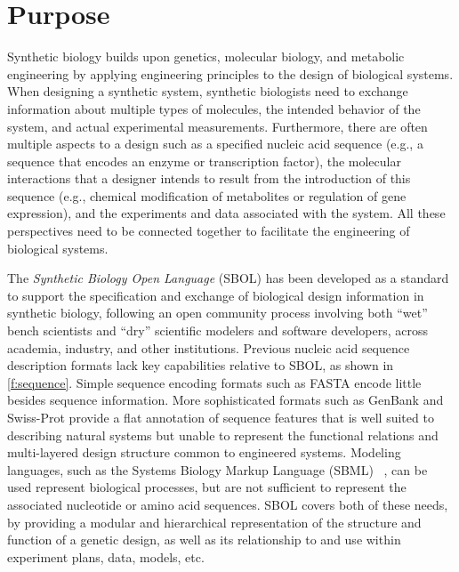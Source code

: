 \section{Purpose}

Synthetic biology builds upon genetics, molecular biology, and metabolic engineering by applying engineering principles to the design of biological systems.
When designing a synthetic system, synthetic biologists need to exchange information about multiple types of molecules, the intended behavior of the system, and actual experimental measurements.
Furthermore, there are often multiple aspects to a design such as a specified nucleic acid sequence (e.g., a sequence that encodes an enzyme or transcription factor), the molecular interactions that a designer intends to result from the introduction of this sequence (e.g., chemical modification of metabolites or regulation of gene expression), and the experiments and data associated with the system. All these perspectives need to be connected together to facilitate the engineering of biological systems.

The \emph{Synthetic Biology Open Language} (SBOL) has been developed as a standard to support the specification and exchange of biological design information in synthetic biology,
following an open community process involving both ``wet'' bench scientists and ``dry'' scientific modelers and software developers, across academia, industry, and other institutions.
Previous nucleic acid sequence description formats lack key capabilities relative to SBOL, as shown in \ref{f:sequence}.
Simple sequence encoding formats such as FASTA encode little besides sequence information.
More sophisticated formats such as GenBank and Swiss-Prot provide a flat annotation of sequence features that is well suited to describing natural systems but unable to represent the functional relations and multi-layered design structure common to engineered systems.
Modeling languages, such as the Systems Biology Markup Language (SBML) ~\cite{SBML}, can be used represent biological processes, but are not sufficient to represent the associated nucleotide or amino acid sequences.
SBOL covers both of these needs, by providing a modular and hierarchical representation of the structure and function of a genetic design, as well as its relationship to and use within experiment plans, data, models, etc.

